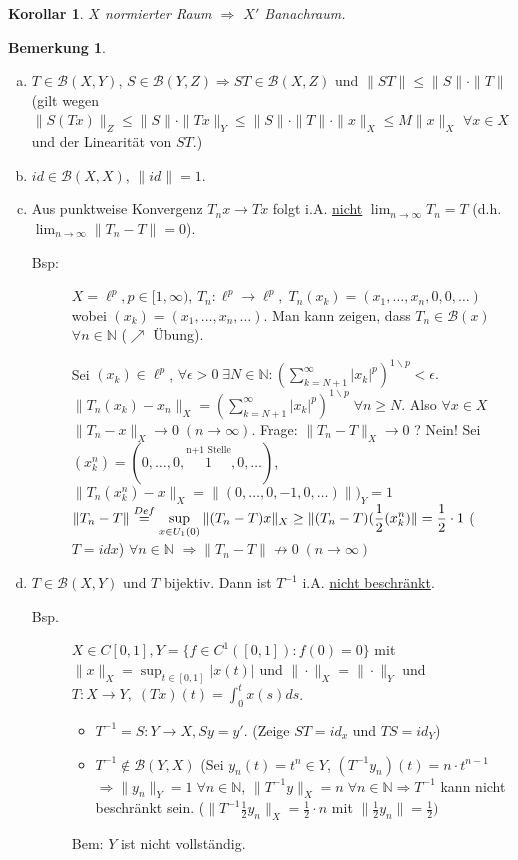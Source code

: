 \documentclass[ngerman]{report}
\theoremstyle{plain}%
\newtheorem{cor}[thm]{Korollar}
\theoremstyle{definition}%
\theoremstyle{myStyle}
\newtheorem{bem}[thm]{Bemerkung}
\newcommand{\N}{\mathbb{N}}
\newcommand{\B}{\mathcal{B}} %
\newcommand{\BS}[1][X,Y]{\mathcal{B}(#1)} %
\newcommand{\norm}[1]{\|#1\|}
\newcommand{\df}[1][]{%
	\overset{#1}{\Rightarrow}
}
\newcommand{\U}[2][1]{U_{#1}(#2)} %
\newcommand{\EK}{\U{0}} %
\newcommand{\limes}[1][\infty]{\lim_{n \to #1}}
\newcommand{\inv}[1]{#1^{-1}}
\newcommand{\supT}[1][a]{
	\IfEqCase{#1}{
	{A}{\sup_{x \in \overline{\EK}}} 
	{R}{\sup_{x \in \partial\EK}}
	{a}{\sup_{x \in \EK}}
	}
} %
\newcommand{\disp}{\displaystyle}
\begin{document}
	\begin{cor}
		$X$ normierter Raum $\df$ $X'$ Banachraum.
	\end{cor}
	\begin{bem}
		\begin{enumerate}[a)]
			\item $T\in \BS$, $S \in \B(Y,Z) \df ST \in \B(X,Z)$ und 
				$\norm{ST} \leq \norm{S} \cdot \norm{T}$ 
				(gilt wegen $\norm{S(Tx)}_Z \leq \norm{S} \cdot \norm{Tx}_Y
				\leq \norm{S} \cdot \norm{T} \cdot \norm{x}_X \leq M \norm{x}_X$ $\forall x\in X$ und der Linearität von $ST$.) 
			\item $id\in \B(X,X)$, $\norm{id} = 1$.
			\item Aus punktweise Konvergenz $T_nx \to Tx$ folgt
			i.A. \underline{nicht} $\disp \limes T_n = T$ (d.h. $\limes \norm{T_n - T} = 0$).
				\begin{description} \item[Bsp:] 
					$X = \ell^p, p\in [1,\infty)$, $T_n:\ell^p \to \ell^p, \; T_n(x_k) = (x_1,\dots,x_n,0,0,\dots)$ 
					wobei $(x_k) = (x_1,\dots,x_n,\dots).$ Man kann zeigen, dass $T_n \in \B(x)$ $\forall n\in\N$ 
					($\nearrow$ Übung).\par
					Sei $(x_k)\in \ell^p$, $\forall \epsilon > 0 \; \exists N\in\N: (\sum_{k=N+1}^\infty |x_k|^p)^{1\backslash p} < \epsilon.$\ $\norm{T_n(x_k) - x_n}_X = (\sum_{k=N+1}^\infty |x_k|^p)^{1\backslash p} \; \forall n\geq N$.
					Also $\forall x \in X$ $\norm{T_n - x}_X \to 0 \; (n\to \infty).$ Frage: $\norm{T_n - T}_X \to 0$ ?
					Nein! Sei $(x_k^n) = (0,\dots,0,\overset{\text{n+1 Stelle}}{1},0,\dots)$,  
					$\norm{T_n(x_k^n) - x}_X = \norm{(0,\dots,0,-1,0,\dots)})_Y = 1$ 
					$\disp \norm{T_n - T} \overset{Def}{=} \supT \norm{(T_n - T)x}_X \geq 
					\norm{(T_n - T)(\frac{1}{2} (x_k^n)} =\frac{1}{2}\cdot 1$ ($T = idx$) $\forall n\in\N$ 
					$\df \norm{T_n - T} \not\to 0\; (n\to\infty)$
				\end{description}

		\item $T\in \BS$ und $T$ bijektiv. Dann ist $\inv{T}$ i.A. \underline{nicht beschränkt}.
			\begin{description} 
				\item[Bsp.]	$X\in C[0,1], Y= \{f\in C^1([0,1]): f(0) = 0\}$ mit $\disp \norm{x}_X = \sup_{t\in[0,1]}|x(t)|$ und $\norm{\cdot}_X = \norm{\cdot}_Y$ und $T: X\to Y,\; (Tx)(t) = \int_0^t x(s)ds$.
				\begin{itemize}
					\item $\inv{T}=S: Y\to X, Sy = y'$. (Zeige $ST = id_x$ und $TS = id_Y$)
					\item $\inv{T}\not\in\B(Y,X)$ (Sei $y_n(t) = t^n\in Y$, $(\inv{T}y_n)(t) = n\cdot t^{n-1}$
					$\df \norm{y_n}_Y =1 \; \forall n\in \N$, $\norm{\inv{T}y}_X =n \; \forall n\in\N \df \inv{T}$ kann nicht beschränkt sein. 
					($\norm{\inv{T}\frac{1}{2} y_n}_X = \frac{1}{2} \cdot n$ mit $\norm{\frac{1}{2} y_n} = \frac{1}{2})$
				\end{itemize}
				Bem: $Y$ ist nicht vollständig.
			\end{description}
		\end{enumerate}
	\end{bem}
\end{document}
